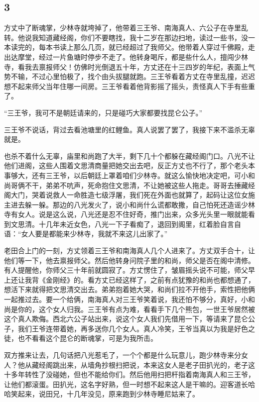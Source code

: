 {\centering\subsection{3}}

方丈中了断魂掌，少林寺就垮掉了，他带着三王爷、南海真人、六公子在寺里乱转。他说我知道藏经阁，你们不要瞎找，我十二岁在那边扫地，读过一些书，没一本读完的，每本书读上那么几页，就已经超过了我师父。他带着人穿过千佛殿，走出达摩堂，经过一片鱼塘时停步不走了。他转身喝斥，都是些什么人，擅闯少林寺，看我去禀报师父！仿佛时光倒退五十年，方丈还在十三四岁的年纪，表面上气势不输，不过心里怕极了，找个由头拔腿就跑。三王爷看着方丈在寺里乱撞，迟迟想不起来师父当年住哪一间房。三王爷看着他背影摇了摇头，责怪真人下手有些重了。

“三王爷，我可不是朝廷请来的，只是碰巧大家都要找昆仑公子。”

三王爷不说话，背过去看池塘里的红鲤鱼。真人说罢了罢了，我接下来不滥杀无辜就是。

也杀不着什么无辜，庙里和尚跑了大半，剩下几十个都躲在藏经阁门口。八光不让他们进阁，这些人围着文思清商量把她交出去吧，反正方丈也不行了，那个老头本事够大，还有三王爷，以后朝廷上罩着咱们少林寺。就这么愉快地决定吧，可小和尚哥俩不干，弟弟不吭声，死命抱住文思清，不让她被这些人拖走。哥哥去捶藏经阁大门，哭着说救人一命胜造七级浮屠，我们死在外面也就算了，起码让这位女施主进去躲一躲。那边的八光发火了，说小和尚什么谎都敢撒，自己怕死还造谣少林寺有女人。说是这么说，八光还是忍不住好奇，推门出来，众多光头里一眼就能看到文思清。十几年未近女色，八光一下子看痴了，退回到阁里，红着脸自言自语：“女人要是都能来少林寺，我就不来这儿出家了。”

老田合上门的一刻，方丈领着三王爷和南海真人几个人进来了。方丈双手合十，让他们等一下，他去禀报师父。然后他转身问院子里的和尚，师父是否在阁中清修。有人提醒他，你师父三十年前就圆寂了。方丈愣住了，皱眉摇头说不可能，师父早上还让我背《金刚经》的。看方丈已经这样了，之前有点犹豫的和尚也都想通了，想活下来就得把文思清交出去。弟弟抱着她大哭，和尚们拉不开他手，索性把他俩一起推过去。要一个给俩，南海真人对三王爷笑着说，我还怕不够分，真好，小和尚是你的，这个女人归我。三王爷有点为难，看看手下几个熊包，一世王爷居然被这个真人欺侮。西北六公子站出来，说这个女人我们先借用一下，等请来了昆仑公子，我们王爷连带着她，再多送你几个女人。真人冷笑，王爷当真以为我是好色之徒，也不看看这个昆仑的断魂掌，可是为我所击。

双方推来让去，几句话把八光惹毛了，一个个都是什么玩意儿，跑少林寺来分女人？他从藏经阁跳出来，从墙角抄根扫把说，本来这女人是老子田扒光的，老子这十多年转性了没碰她，但也不能给你们。然后他用扫把杆指着南海真人和三王爷，让他们都滚蛋。田扒光，这名字好熟，但一时想不起来这人是干嘛的。迎客道长哈哈笑起来，说田兄，十几年没见，原来跑到少林寺睡尼姑来了。

